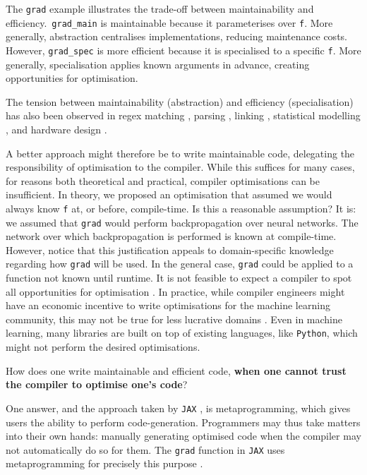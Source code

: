 The \texttt{grad} example illustrates the trade-off between maintainability and efficiency.\ \texttt{grad_main} is maintainable because it parameterises over \texttt{f}. More generally, abstraction centralises implementations, reducing maintenance costs. However, \texttt{grad_spec} is more efficient because it is specialised to a specific \texttt{f}. More generally, specialisation applies known arguments in advance, creating opportunities for optimisation. 

The tension between maintainability (abstraction) and efficiency (specialisation) has also been observed in regex matching \citep{tratt-2008}, parsing \citep{yallop-2023}, linking \citep{servetto-2013}, statistical modelling \citep{wickham-2019}, and hardware design \citep{vandebon-2021}.

A better approach might therefore be to write maintainable code, delegating the responsibility of optimisation to the compiler. While this suffices for many cases, for reasons both theoretical and practical, compiler optimisations can be insufficient. In theory, we proposed an optimisation that assumed we would always know \texttt{f} at, or before, compile-time. Is this a reasonable assumption? It is: we assumed that \texttt{grad} would perform backpropagation over neural networks. The network over which backpropagation is performed is known at compile-time. However, notice that this justification appeals to domain-specific knowledge regarding how \texttt{grad} will be used. In the general case, \texttt{grad} could be applied to a function not known until runtime. It is not feasible to expect a compiler to spot all opportunities for optimisation \citep{rice-53}. In practice, while compiler engineers might have an economic incentive to write optimisations for the machine learning community, this may not be true for less lucrative domains \citep{robinson-01}. Even in machine learning, many libraries are built on top of existing languages, like \texttt{Python}, which might not perform the desired optimisations.

How does one write maintainable and efficient code, \textbf{when one cannot trust the compiler to optimise one's code}?

One answer, and the approach taken by \texttt{JAX} \citep{jax-grad-metaprogramming}, is metaprogramming, which gives users the ability to perform code-generation. Programmers may thus take matters into their own hands: manually generating optimised code when the compiler may not automatically do so for them. The \texttt{grad} function in \texttt{JAX} uses metaprogramming for precisely this purpose \citep{jax-grad-metaprogramming}.

